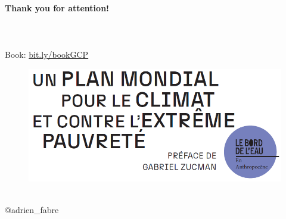 \documentclass[aspectratio=169,xcolor=dvipsnames, 11pt,mathserif]{beamer}
\begin{document}
\begin{framefont}{\small}

\begin{frame}{}
\centering \Large \textbf{Thank you for attention!}
% 
\\ \quad \\ \quad \\  
\\ Book: \href{https://bit.ly/bookGCP}{bit.ly/bookGCP}
\begin{figure}
    \includegraphics[height=.37\textheight]{../figures/book_title.png} 
\end{figure}    
~\\ @adrien\_fabre 
\end{frame}


\end{framefont}
\end{document}
